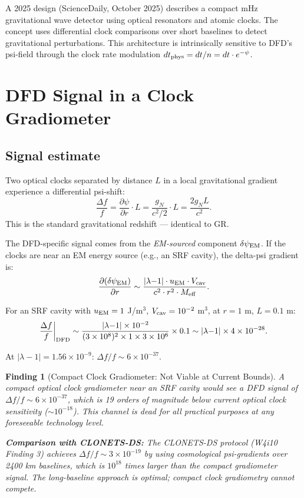 \documentclass[11pt]{article}
\newtheorem{finding}{Finding}
\newcommand{\ee}[1]{\times 10^{#1}}
\newcommand{\dpsiEM}{\delta\psi_{\rm EM}}
\newcommand{\Meff}{M_{\rm eff}}
\newcommand{\lambdaone}{|\lambda{-}1|}
\begin{document}
A 2025 design (ScienceDaily, October 2025) describes a compact mHz
gravitational wave detector using optical resonators and atomic clocks.
The concept uses differential clock comparisons over short baselines
to detect gravitational perturbations. This architecture is
intrinsically sensitive to DFD's psi-field through the clock rate
modulation $dt_{\rm phys} = dt/n = dt \cdot e^{-\psi}$.

\section{DFD Signal in a Clock Gradiometer}

\subsection{Signal estimate}

Two optical clocks separated by distance $L$ in a local gravitational
gradient experience a differential psi-shift:
\begin{equation}
\frac{\Delta f}{f} = \frac{\partial\psi}{\partial r} \cdot L
= \frac{g_N}{c^2/2} \cdot L = \frac{2g_N L}{c^2}.
\end{equation}
This is the standard gravitational redshift --- identical to GR.

The DFD-specific signal comes from the \emph{EM-sourced} component
$\dpsiEM$. If the clocks are near an EM energy source (e.g., an SRF
cavity), the delta-psi gradient is:
\begin{equation}
\frac{\partial(\dpsiEM)}{\partial r} \sim \frac{\lambdaone \cdot u_{\rm EM}
\cdot V_{\rm cav}}{c^2 \cdot r^2 \cdot \Meff}.
\end{equation}

For an SRF cavity with $u_{\rm EM} = 1$ J/m$^3$, $V_{\rm cav} = 10^{-2}$
m$^3$, at $r = 1$ m, $L = 0.1$ m:
\begin{equation}
\frac{\Delta f}{f}\bigg|_{\rm DFD} \sim \frac{\lambdaone \times 10^{-2}}
{(3\ee{8})^2 \times 1 \times 3\ee{6}} \times 0.1
\sim \lambdaone \times 4\ee{-28}.
\end{equation}

At $\lambdaone = 1.56\ee{-9}$: $\Delta f/f \sim 6\ee{-37}$.

\begin{finding}[Compact Clock Gradiometer: Not Viable at Current Bounds]
\label{find:clock}
A compact optical clock gradiometer near an SRF cavity would see a
DFD signal of $\Delta f/f \sim 6\ee{-37}$, which is 19 orders of
magnitude below current optical clock sensitivity ($\sim 10^{-18}$).
This channel is dead for all practical purposes at any foreseeable
technology level.

\textbf{Comparison with CLONETS-DS:} The CLONETS-DS protocol
(W4i10 Finding 3) achieves $\Delta f/f \sim 3\ee{-19}$ by using
cosmological psi-gradients over 2400 km baselines, which is
$10^{18}$ times larger than the compact gradiometer signal. The
long-baseline approach is optimal; compact clock gradiometry
cannot compete.
\end{finding}
\end{document}
